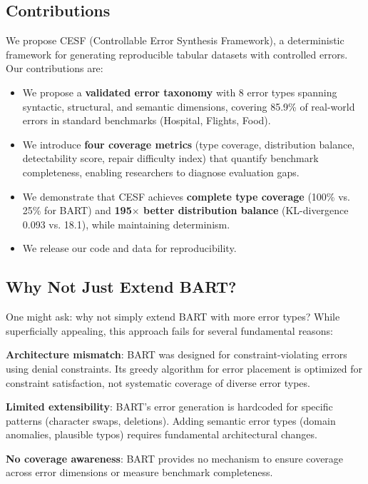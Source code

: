 \documentclass[11pt,a4paper]{article}
\begin{document}
\subsection{Contributions}

We propose CESF (Controllable Error Synthesis Framework), a deterministic framework for generating reproducible tabular datasets with controlled errors. Our contributions are:

\begin{itemize}
    \item We propose a \textbf{validated error taxonomy} with 8 error types spanning syntactic, structural, and semantic dimensions, covering 85.9\% of real-world errors in standard benchmarks (Hospital, Flights, Food).
    \item We introduce \textbf{four coverage metrics} (type coverage, distribution balance, detectability score, repair difficulty index) that quantify benchmark completeness, enabling researchers to diagnose evaluation gaps.
    \item We demonstrate that CESF achieves \textbf{complete type coverage} (100\% vs. 25\% for BART) and \textbf{195$\times$ better distribution balance} (KL-divergence 0.093 vs. 18.1), while maintaining determinism.
    \item We release our code and data for reproducibility.
\end{itemize}

\subsection{Why Not Just Extend BART?}

One might ask: why not simply extend BART with more error types? While superficially appealing, this approach fails for several fundamental reasons:

\textbf{Architecture mismatch}: BART was designed for constraint-violating errors using denial constraints. Its greedy algorithm for error placement is optimized for constraint satisfaction, not systematic coverage of diverse error types.

\textbf{Limited extensibility}: BART's error generation is hardcoded for specific patterns (character swaps, deletions). Adding semantic error types (domain anomalies, plausible typos) requires fundamental architectural changes.

\textbf{No coverage awareness}: BART provides no mechanism to ensure coverage across error dimensions or measure benchmark completeness.
\end{document}
